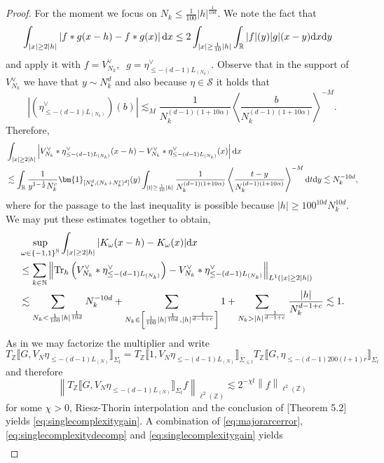 \documentclass[12pt,leqno]{amsart}
\def\d{{\rm d}}
\def\R {\mathbb{R}}
\def\N {\mathbb{N}}
\def\Tr {{\mathrm{Tr}}}
\def\Z {{\mathbb Z}}
\newcommand{\cic}{\bm}
\numberwithin{equation}{section}
\numberwithin{counter2}{section}
\theoremstyle{definition}
\theoremstyle{plain}
\begin{document}
\begin{proof}
		For the moment we focus on $N_k \leq \frac{1}{100} |h|^{\frac{1}{10d}}.$ We  note the fact that  
		\[ \begin{split}
			&	\int_{|x| \geq 2 |h|} \left| f*g(x-h)-f*g(x) \right| \d x \leq  2 \int_{|x| \geq \frac{1}{10}|h|} \int_{\R}|f|(y) |g|(x-y) \d  x  \d y  
		\end{split}   \]
		and apply it with $ f=V_{N_k}^{\vee}, \; \; g= \eta_{\le -(d-1) L_{(N_k)}}^{\vee}.$ 
		Observe that in the support of $V_{N_k}^{\vee}$ we have that $y \sim N_k^d$ and also because $\eta \in \mathcal{S}$ it holds that \[  \left|(\eta_{\le - (d-1)L_{(N_k)}}^{\vee})(b)\right| \lesssim_M \frac{1}{N_k^{(d-1)(1+10\alpha )}} \left \langle \frac{b}{N_k^{(d-1)(1+10\alpha)}} \right \rangle^{-M}. \] Therefore, \[  \begin{split}
			&	\int_{|x| \geq 2 |h|} \left| V_{N_k}^{\vee}*\eta_{\le -(d-1) L_{(N_k)}}^{\vee}(x-h)-V_{N_k}^{\vee}*\eta_{\le -(d-1) L_{(N_k)}}^{\vee}(x) \right| \d x \\ & \lesssim    \int_{\R}  \frac{1}{y^{1-\frac{1}{d}}N_k^c} \cic{1}_{[N_k^d,(N_k+N_k^c)^d]}(y)   \int_{|t| \geq  \frac{1}{10} |h| } \frac{1}{N_k^{(d-1)(1+10\alpha)}} \left \langle \frac{t-y}{N_k^{(d-1)(1+10\alpha)}} \right \rangle^{-M} \d t  \d y   \lesssim N_k^{-10d},
		\end{split}  \]
		where for the passage to the last inequality is possible because $ |h| \geq 100^{10d} N_k^{10d}.$ We may put these estimates together to obtain, \[ \begin{split}
		&	\sup_{\omega \in  \left\{-1,1\right\}^{\N}}\int_{|x| \geq 2|h|}|K_{\omega}(x-h)-K_{\omega}(x)| \d x  \\ &\leq \sum_{k \in \N} 	\left \| \Tr_h\left( V_{N_k}^{\vee} * \eta_{\le - (d-1)L_{(N_k)}}^{\vee} \right)- V_{N_k}^{\vee} * \eta_{\le -(d-1) L_{(N_k)}}^{\vee}\right \|_{L^1(|x| \geq 2 |h| )} \\ &  \lesssim  \sum_{N_k < \frac{1}{100}|h|^{\frac{1}{10d}} }N_k^{-10d}+\sum_{N_k \in  \left[\frac{1}{100} |h|^{\frac{1}{10d}},  |h|^{\frac{1}{d-1+c}}\right] }1+ \sum_{N_k > |h|^{\frac{1}{d-1+c}} }\frac{|h|}{N_k^{d-1+c}} \lesssim 1.
		\end{split}  \]
		As in \cite{KMSZ26} we may factorize the multiplier and write  \[ T_{\Z}\llbracket G , V_N \eta_{\leq -(d-1)L_{(N)}} \rrbracket_{\Sigma_{  l}}= T_{\Z}  \llbracket 1, V_N \eta_{\leq -(d-1)L_{(N)}} \rrbracket_{\Sigma_{ \leq l}}  T_{\Z}\llbracket G, \eta_{\leq -(d-1)200(l+1)r} \rrbracket_{\Sigma_l}    \] and therefore \[ \left \| T_{\Z}\llbracket G , V_N \eta_{\leq -(d-1)L_{(N)}} \rrbracket_{\Sigma_{  l}}f \right \|_{\ell^2(\Z)}  \lesssim 2^{-\chi l}  \left \| f \right \|_{\ell^2(\Z)}  \] for some $\chi>0 $, Riesz-Thorin interpolation and the conclusion of \cite{KMSZ26}[Theorem 5.2] yields \eqref{eq:singlecomplexitygain}. A combination of \eqref{eq:majorarcerror},\eqref{eq:singlecomplexitydecomp} and \eqref{eq:singlecomplexitygain} yields \[\begin{split}

\end{split}\]
\end{proof}
\end{document}
